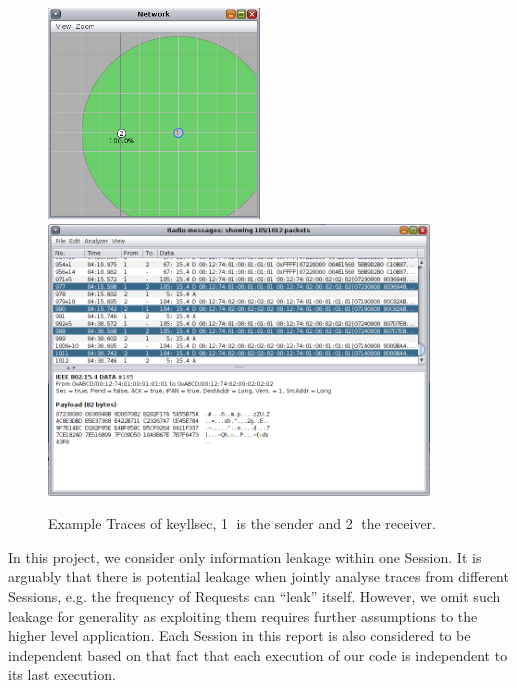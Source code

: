 \begin{figure}[h!]
	\center
	\includegraphics[width=0.5\textwidth]{fig/unicast_keyllsec.png}
	\\
	\includegraphics[width=0.9\textwidth]{fig/trace_keyllsec.png}
	\caption{
		Example Traces of keyllsec, \textcircled{1} is the sender and \textcircled{2} the receiver.
	}
	\label{Fig: Example Traces of keyllsec}
\end{figure}

In this project, we consider only information leakage within one Session. It is arguably that there is potential leakage when jointly analyse traces from different Sessions, e.g. the frequency of Requests can ``leak'' itself. However, we omit such leakage for generality as exploiting them requires further assumptions to the higher level application. Each Session in this report is also considered to be independent based on that fact that each execution of our code is independent to its last execution.


